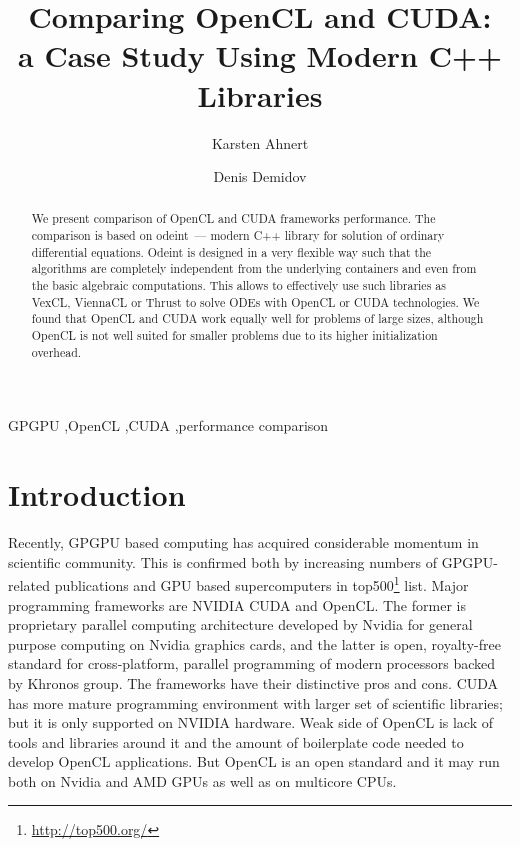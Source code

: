 \documentclass[1p]{elsarticle}
\begin{document}
\begin{frontmatter}

\title{Comparing OpenCL and CUDA:\\a Case Study Using Modern C++ Libraries}

\author{Karsten Ahnert}
\address{
Institut f\"ur Physik und Astronomie, Universit\"at Potsdam,\\
Karl-Liebknecht-Strasse 24/25, 14476 Potsdam-Golm, Germany
}

\author{Denis Demidov}
\address{
Kazan Branch of Joint Supercomputer Center,
Russian Academy of Sciences,\\
Lobachevsky st. 2/31, 420008 Kazan, Russia
}

\begin{abstract}
    We present comparison of OpenCL and CUDA frameworks performance. The
    comparison is based on odeint~--- modern C++ library for solution of
    ordinary differential equations. Odeint is designed in a very flexible way
    such that the algorithms are completely independent from the underlying
    containers and even from the basic algebraic computations. This allows to
    effectively use such libraries as VexCL, ViennaCL or Thrust to solve ODEs
    with OpenCL or CUDA technologies. We found that OpenCL and CUDA work
    equally well for problems of large sizes, although OpenCL is not well
    suited for smaller problems due to its higher initialization overhead.
\end{abstract}

\begin{keyword}
    GPGPU \sep OpenCL \sep CUDA \sep performance comparison
\end{keyword}

\end{frontmatter}

\section{Introduction}

Recently, GPGPU based computing has acquired considerable momentum in
scientific community. This is confirmed both by increasing numbers of
GPGPU-related publications and GPU based supercomputers in
top500\footnote{\href{http://top500.org/}{http://top500.org/}} list. Major
programming frameworks are NVIDIA CUDA and OpenCL.  The former is proprietary
parallel computing architecture developed by Nvidia for general purpose
computing on Nvidia graphics cards, and the latter is open, royalty-free
standard for cross-platform, parallel programming of modern processors backed
by Khronos group. The frameworks have their distinctive pros and cons. CUDA has
more mature programming environment with larger set of scientific libraries;
but it is only supported on NVIDIA hardware. Weak side of OpenCL is lack of
tools and libraries around it and the amount of boilerplate code needed to
develop OpenCL applications. But OpenCL is an open standard and it may run both
on Nvidia and AMD GPUs as well as on multicore CPUs.
\end{document}
